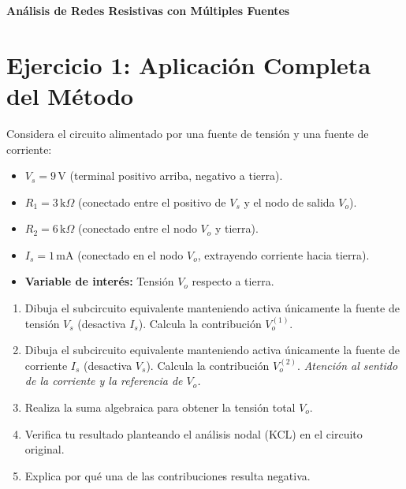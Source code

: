\documentclass[11pt, a4paper]{article}
\begin{document}
\begin{tcolorbox}[colback=ucbblue!5!white, colframe=ucbblue, title=\textbf{Hoja de Ejercicios: Teorema de Superposición}]
    \centering \large \textbf{Análisis de Redes Resistivas con Múltiples Fuentes}
\end{tcolorbox}

\section*{Ejercicio 1: Aplicación Completa del Método}
Considera el circuito alimentado por una fuente de tensión y una fuente de corriente:
\begin{itemize}
    \item $V_s = 9\,\text{V}$ (terminal positivo arriba, negativo a tierra).
    \item $R_1 = 3\,\text{k}\Omega$ (conectado entre el positivo de $V_s$ y el nodo de salida $V_o$).
    \item $R_2 = 6\,\text{k}\Omega$ (conectado entre el nodo $V_o$ y tierra).
    \item $I_s = 1\,\text{mA}$ (conectado en el nodo $V_o$, extrayendo corriente hacia tierra).
    \item \textbf{Variable de interés:} Tensión $V_o$ respecto a tierra.
\end{itemize}

\begin{enumerate}
    \item Dibuja el subcircuito equivalente manteniendo activa únicamente la fuente de tensión $V_s$ (desactiva $I_s$). Calcula la contribución $V_o^{(1)}$.
    \item Dibuja el subcircuito equivalente manteniendo activa únicamente la fuente de corriente $I_s$ (desactiva $V_s$). Calcula la contribución $V_o^{(2)}$. \textit{Atención al sentido de la corriente y la referencia de $V_o$.}
    \item Realiza la suma algebraica para obtener la tensión total $V_o$.
    \item Verifica tu resultado planteando el análisis nodal (KCL) en el circuito original.
    \item Explica por qué una de las contribuciones resulta negativa.
\end{enumerate}
\end{document}
